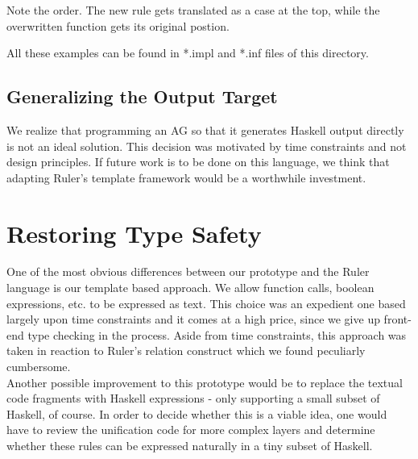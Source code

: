 \documentclass[10pt]{article}
\begin{document}
Note the order. The new rule gets translated as a case at the top, while the overwritten function gets its original postion.

All these examples can be found in *.impl and *.inf files of this directory.

\subsection{Generalizing the Output Target}
We realize that programming an AG so that it generates Haskell output directly is not an ideal solution.  This decision was motivated by time constraints and not design principles.  If future work is to be done on this language, we think that adapting Ruler's template framework would be a worthwhile investment.

\section{Restoring Type Safety}
One of the most obvious differences between our prototype and the Ruler language is our template
based approach.  We allow function calls, boolean expressions, etc. to be expressed as text.  This
choice was an expedient one based largely upon time constraints and it comes at a high price, since
we give up front-end type checking in the process.  Aside from time constraints, this approach was taken in reaction to Ruler's relation construct which we found peculiarly cumbersome.  \\

Another possible improvement to this prototype would be to replace the textual code fragments with Haskell expressions - only supporting a small subset of Haskell, of course.  In order to decide whether this is a viable idea, one would have to review the unification code for more complex layers and determine whether these rules can be expressed naturally in a tiny subset of Haskell.
\end{document}
